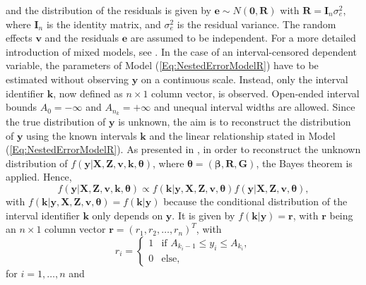 and the distribution of the residuals is given by \(\mathbf{e}\sim N\left(\mathbf{0},\mathbf{R}\right)\) with \(\mathbf{R}=\mathbf{I}_{n}\sigma_{e}^{2}\), where \(\mathbf{I}_{n}\) is the identity matrix, and \(\sigma^{2}_{e}\) is the residual variance. The random effects \(\mathbf{v}\) and the residuals \(\mathbf{e}\) are assumed to be independent. For a more detailed introduction of mixed models, see \citet{Sea92, McC08, Sni11}. In the case of an interval-censored dependent variable, the parameters of Model (\ref{Eq:NestedErrorModelR}) have to be estimated without observing \(\mathbf{y}\) on a continuous scale. Instead, only the interval identifier \(\mathbf{k}\), now defined as \(n\times 1\) column vector, is observed. Open-ended interval bounds \(A_{0}=-\infty \)  and \(A_{n_{k}}=+\infty\) and unequal interval widths are allowed. Since the true distribution of \(\mathbf{y}\) is unknown, the aim is to reconstruct the distribution of \(\mathbf{y}\)  using the known intervals  \(\mathbf{k}\) and the linear relationship stated in Model (\ref{Eq:NestedErrorModelR}). As presented in \citet{Wal19}, in order to reconstruct the unknown distribution of \(f\left(\mathbf{y}|\mathbf{X}, \mathbf{Z}, \mathbf{v}, \mathbf{k}, \boldsymbol{\theta}\right)\), where \(\boldsymbol{\theta} = \left(\boldsymbol{\beta},\mathbf{R}, \mathbf{G}\right)\), the Bayes theorem \citep{Bay63} is applied. Hence,
\begin{equation*}
f\left(\mathbf{y}|\mathbf{X}, \mathbf{Z}, \mathbf{v}, \mathbf{k}, \boldsymbol{\theta}\right) \propto f\left(\mathbf{k}|\mathbf{y}, \mathbf{X}, \mathbf{Z}, \mathbf{v}, \boldsymbol{\theta}\right)f\left(\mathbf{y}|\mathbf{X}, \mathbf{Z}, \mathbf{v}, \boldsymbol{\theta}\right),
\end{equation*}
with \(f\left(\mathbf{k}|\mathbf{y}, \mathbf{X}, \mathbf{Z}, \mathbf{v}, \boldsymbol{\theta}\right)=f\left(\mathbf{k}|\mathbf{y}\right)\) because the conditional distribution of the interval identifier \(\mathbf{k}\) only depends on \(\mathbf{y}\). It is given by \(f\left(\mathbf{k}|\mathbf{y}\right)=\mathbf{r}\), with \(\mathbf{r}\) being an \(n \times 1\) column vector \(\mathbf{r}=\left(r_{1},r_{2}, \ldots , r_{n} \right)^{T} \), with 
\begin{equation*}
r_{i}=\begin{cases}
  1  & \text{if } A_{k_{i}-1} \leq y_{i} \leq A_{k_{i}}, \\ 
  0 & \text{else, }
\end{cases}
\end{equation*}
for \(i=1, \ldots, n\) and 
